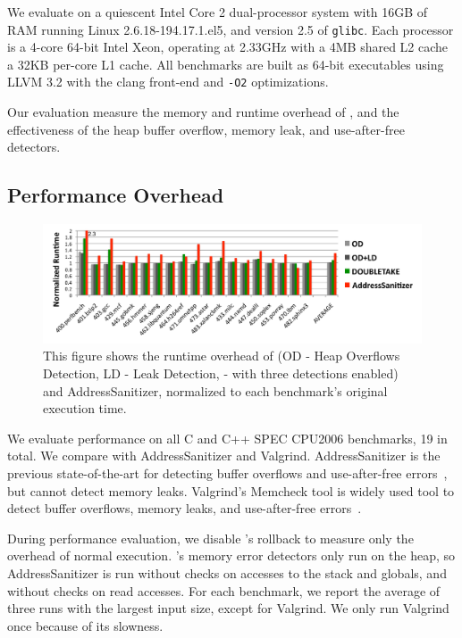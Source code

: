 \label{sec:evaluation}

We evaluate \doubletake{} on a quiescent Intel Core 2 dual-processor system with 16GB of RAM running Linux 2.6.18-194.17.1.el5, and version 2.5 of \texttt{glibc}. Each processor is a 4-core 64-bit Intel Xeon, operating at 2.33GHz with a 4MB shared L2 cache a 32KB per-core L1 cache. All benchmarks are built as 64-bit executables using LLVM 3.2 with the clang front-end and \texttt{-O2} optimizations.

Our evaluation measure the memory and runtime overhead of \doubletake{}, and the effectiveness of the heap buffer overflow, memory leak, and use-after-free detectors.

\subsection{Performance Overhead}
\label{sec:perf}

\begin{figure}[!ht]
	\begin{center}
		\includegraphics[width=6.5in]{figure/perf}
	\end{center}
	\caption{This figure shows the runtime overhead of \doubletake{} (OD - Heap Overflows Detection, LD - Leak Detection, \doubletake{} - with three detections enabled) and AddressSanitizer, normalized to each benchmark's original execution time. 
\label{fig:perf}}
\end{figure}

We evaluate performance on all C and C++ SPEC CPU2006 benchmarks, 19 in total. We compare \doubletake{} with AddressSanitizer and Valgrind. AddressSanitizer is the previous state-of-the-art for detecting buffer overflows and use-after-free errors~\cite{AddressSanitizer}, but cannot detect memory leaks. Valgrind's Memcheck tool is widely used tool to detect buffer overflows, memory leaks, and use-after-free errors~\cite{overflow:valgrind}. 

During performance evaluation, we disable \doubletake{}'s rollback to measure only the overhead of normal execution. \doubletake{}'s memory error detectors only run on the heap, so AddressSanitizer is run without checks on accesses to the stack and globals, and without checks on read accesses. For each benchmark, we report the average of three runs with the largest input size, except for Valgrind. We only run Valgrind once because of its slowness. 

